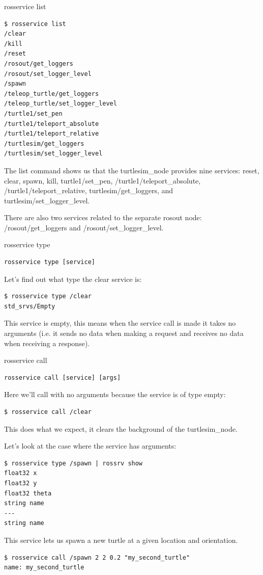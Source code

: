 \begin{frame}[fragile]{rosservice list}
\begin{lstlisting}[language=shell]
$ rosservice list
/clear
/kill
/reset
/rosout/get_loggers
/rosout/set_logger_level
/spawn
/teleop_turtle/get_loggers
/teleop_turtle/set_logger_level
/turtle1/set_pen
/turtle1/teleport_absolute
/turtle1/teleport_relative
/turtlesim/get_loggers
/turtlesim/set_logger_level
\end{lstlisting}
The list command shows us that the turtlesim\_node provides nine services: reset, clear, spawn, kill, turtle1/set\_pen, /turtle1/teleport\_absolute, /turtle1/teleport\_relative, turtlesim/get\_loggers, and turtlesim/set\_logger\_level.

\vspace{.1cm}
There are also two services related to the separate rosout node: /rosout/get\_loggers and /rosout/set\_logger\_level.
\end{frame}

\begin{frame}[fragile]{rosservice type}
\begin{lstlisting}[language=syntax]
rosservice type [service]
\end{lstlisting}
Let's find out what type the clear service is:
\begin{lstlisting}[language=shell]
$ rosservice type /clear
std_srvs/Empty
\end{lstlisting}
This service is empty, this means when the service call is made it takes no arguments (i.e. it sends no data when making a request and receives no data when receiving a response).
\end{frame}

\begin{frame}[fragile]{rosservice call}
\begin{lstlisting}[language=syntax]
rosservice call [service] [args]
\end{lstlisting}

Here we'll call with no arguments because the service is of type empty:
\begin{lstlisting}[language=shell]
$ rosservice call /clear
\end{lstlisting}
This does what we expect, it clears the background of the turtlesim\_node.

\vspace{.1cm}
Let's look at the case where the service has arguments:
\begin{lstlisting}[language=shell]
$ rosservice type /spawn | rossrv show
float32 x
float32 y
float32 theta
string name
---
string name
\end{lstlisting}
This service lets us spawn a new turtle at a given location and orientation. 
\begin{lstlisting}[language=shell]
$ rosservice call /spawn 2 2 0.2 "my_second_turtle"
name: my_second_turtle
\end{lstlisting}
\end{frame}

